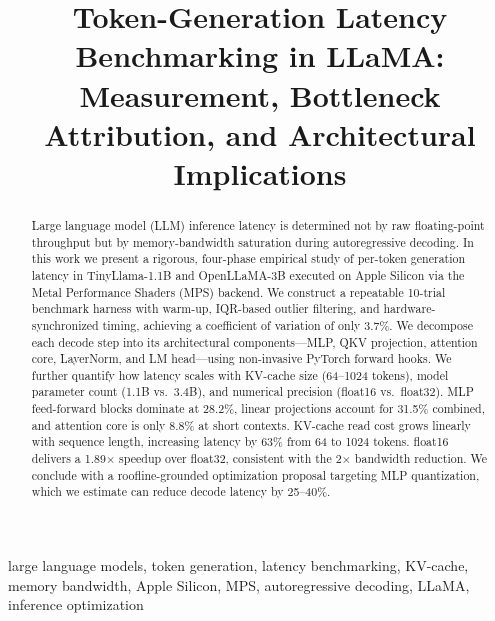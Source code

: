 \documentclass[conference]{IEEEtran}
\begin{document}
\title{Token-Generation Latency Benchmarking in LLaMA:\\
Measurement, Bottleneck Attribution, and Architectural Implications}

\author{
}

\maketitle

\begin{abstract}
Large language model (LLM) inference latency is determined not by raw
floating-point throughput but by memory-bandwidth saturation during
autoregressive decoding. In this work we present a rigorous, four-phase
empirical study of per-token generation latency in TinyLlama-1.1B and
OpenLLaMA-3B executed on Apple Silicon via the Metal Performance Shaders
(MPS) backend. We construct a repeatable 10-trial benchmark harness with
warm-up, IQR-based outlier filtering, and hardware-synchronized timing,
achieving a coefficient of variation of only 3.7\%. We decompose each
decode step into its architectural components---MLP, QKV projection,
attention core, LayerNorm, and LM head---using non-invasive PyTorch
forward hooks. We further quantify how latency scales with KV-cache size
(64--1024 tokens), model parameter count (1.1B vs.\ 3.4B), and numerical
precision (float16 vs.\ float32). MLP feed-forward blocks dominate at
28.2\%, linear projections account for 31.5\% combined, and attention
core is only 8.8\% at short contexts. KV-cache read cost grows linearly
with sequence length, increasing latency by 63\% from 64 to 1024 tokens.
float16 delivers a 1.89$\times$ speedup over float32, consistent with the
2$\times$ bandwidth reduction. We conclude with a roofline-grounded
optimization proposal targeting MLP quantization, which we estimate can
reduce decode latency by 25--40\%.
\end{abstract}

\begin{IEEEkeywords}
large language models, token generation, latency benchmarking, KV-cache,
memory bandwidth, Apple Silicon, MPS, autoregressive decoding, LLaMA,
inference optimization
\end{IEEEkeywords}
\end{document}
